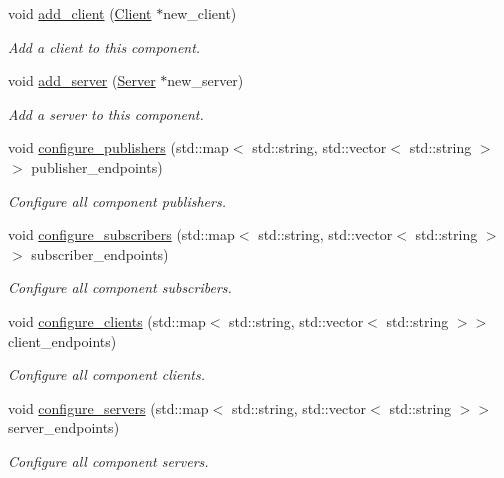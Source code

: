 \begin{DoxyCompactItemize}
void \hyperlink{classzcm_1_1Component_ad71bf4cebc218089642d16f697a493fa}{add\+\_\+client} (\hyperlink{classzcm_1_1Client}{Client} $\ast$new\+\_\+client)
\begin{DoxyCompactList}\small\item\em Add a client to this component. \end{DoxyCompactList}\item 
void \hyperlink{classzcm_1_1Component_a31989e75d9de6093cb712148cd94da71}{add\+\_\+server} (\hyperlink{classzcm_1_1Server}{Server} $\ast$new\+\_\+server)
\begin{DoxyCompactList}\small\item\em Add a server to this component. \end{DoxyCompactList}\item 
void \hyperlink{classzcm_1_1Component_a64674700fb1edd7c84a64ce78aa5b2f4}{configure\+\_\+publishers} (std\+::map$<$ std\+::string, std\+::vector$<$ std\+::string $>$$>$ publisher\+\_\+endpoints)
\begin{DoxyCompactList}\small\item\em Configure all component publishers. \end{DoxyCompactList}\item 
void \hyperlink{classzcm_1_1Component_a25c31193982bb317186f4f3b4d8d790c}{configure\+\_\+subscribers} (std\+::map$<$ std\+::string, std\+::vector$<$ std\+::string $>$$>$ subscriber\+\_\+endpoints)
\begin{DoxyCompactList}\small\item\em Configure all component subscribers. \end{DoxyCompactList}\item 
void \hyperlink{classzcm_1_1Component_ad3ed49fb7e936de3fd66ac4e37974735}{configure\+\_\+clients} (std\+::map$<$ std\+::string, std\+::vector$<$ std\+::string $>$$>$ client\+\_\+endpoints)
\begin{DoxyCompactList}\small\item\em Configure all component clients. \end{DoxyCompactList}\item 
void \hyperlink{classzcm_1_1Component_a9a8df5c1a899ec4470dd5bbcd90e9e79}{configure\+\_\+servers} (std\+::map$<$ std\+::string, std\+::vector$<$ std\+::string $>$$>$ server\+\_\+endpoints)
\begin{DoxyCompactList}\small\item\em Configure all component servers. \end{DoxyCompactList}\item 

\end{DoxyCompactItemize}
